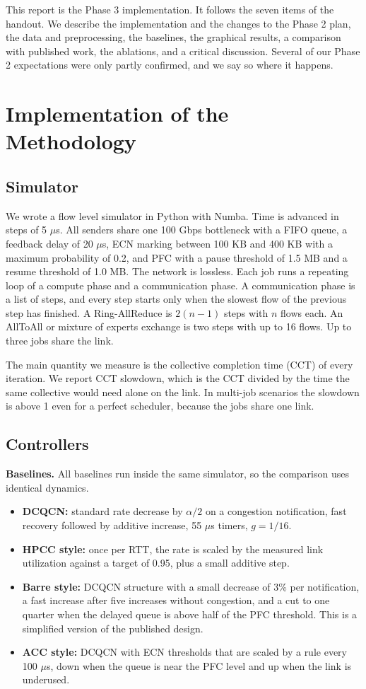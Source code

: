 \documentclass[conference]{IEEEtran}
\begin{document}
This report is the Phase 3 implementation. It follows the seven items of the handout. We describe the implementation and the changes to the Phase 2 plan, the data and preprocessing, the baselines, the graphical results, a comparison with published work, the ablations, and a critical discussion. Several of our Phase 2 expectations were only partly confirmed, and we say so where it happens.

\section{Implementation of the Methodology}

\subsection{Simulator}
We wrote a flow level simulator in Python with Numba. Time is advanced in steps of 5 $\mu$s. All senders share one 100 Gbps bottleneck with a FIFO queue, a feedback delay of 20 $\mu$s, ECN marking between 100 KB and 400 KB with a maximum probability of 0.2, and PFC with a pause threshold of 1.5 MB and a resume threshold of 1.0 MB. The network is lossless. Each job runs a repeating loop of a compute phase and a communication phase. A communication phase is a list of steps, and every step starts only when the slowest flow of the previous step has finished. A Ring-AllReduce is $2(n-1)$ steps with $n$ flows each. An AllToAll or mixture of experts exchange is two steps with up to 16 flows. Up to three jobs share the link.

The main quantity we measure is the collective completion time (CCT) of every iteration. We report CCT slowdown, which is the CCT divided by the time the same collective would need alone on the link. In multi-job scenarios the slowdown is above 1 even for a perfect scheduler, because the jobs share one link.

\subsection{Controllers}
\textbf{Baselines.} All baselines run inside the same simulator, so the comparison uses identical dynamics.
\begin{itemize}
\item \textbf{DCQCN:} standard rate decrease by $\alpha/2$ on a congestion notification, fast recovery followed by additive increase, 55 $\mu$s timers, $g=1/16$.
\item \textbf{HPCC style:} once per RTT, the rate is scaled by the measured link utilization against a target of 0.95, plus a small additive step.
\item \textbf{Barre style:} DCQCN structure with a small decrease of 3\% per notification, a fast increase after five increases without congestion, and a cut to one quarter when the delayed queue is above half of the PFC threshold. This is a simplified version of the published design.
\item \textbf{ACC style:} DCQCN with ECN thresholds that are scaled by a rule every 100 $\mu$s, down when the queue is near the PFC level and up when the link is underused.
\end{itemize}
\end{document}
